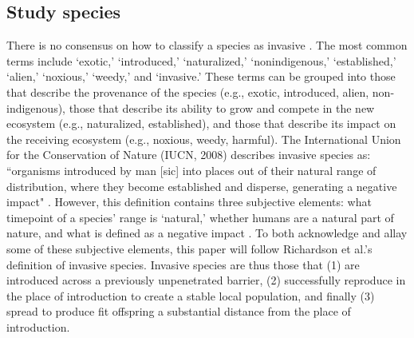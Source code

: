 \documentclass[12pt]{article}\usepackage[]{graphicx}\usepackage[]{color}
\begin{document}
	\subsection{Study species}
	There is no consensus on how to classify a species as invasive \parencite{Colautti2004}. The most common terms include `exotic,' `introduced,' `naturalized,' `nonindigenous,' `established,' `alien,' `noxious,' `weedy,' and `invasive.' These terms can be grouped into those that describe the provenance of the species (e.g., exotic, introduced, alien, non-indigenous), those that describe its ability to grow and compete in the new ecosystem (e.g., naturalized, established), and those that describe its impact on the receiving ecosystem (e.g., noxious, weedy, harmful). The International Union for the Conservation of Nature (IUCN, 2008) describes invasive species as: ``organisms introduced by man [sic] into places out of their natural range of distribution, where they become established and disperse, generating a negative impact" \parencite{IUCN2008is}. However, this definition contains three subjective elements: what timepoint of a species' range is `natural,' whether humans are a natural part of nature, and what is defined as a negative impact \parencite{Munro2019}. To both acknowledge and allay some of these subjective elements, this paper will follow Richardson et al.'s \parencite{Richardson2000,Richardson2011} definition of invasive species. Invasive species are thus those that (1) are introduced across a previously unpenetrated barrier, (2) successfully reproduce in the place of introduction to create a stable local population, and finally (3) spread to produce fit offspring a substantial distance from the place of introduction.
	
\end{document}
